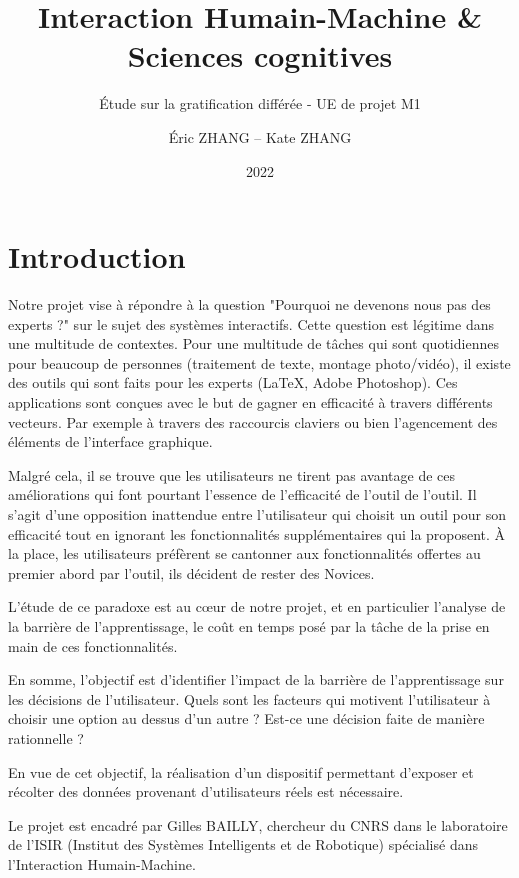 \documentclass[a4paper, 12pt]{report}
\institute{Sorbonne Université}
\title{Interaction Humain-Machine \& Sciences cognitives}
\subtitle{Étude sur la gratification différée - UE de projet M1}
\author{Éric \textsc{ZHANG} -- Kate \textsc{ZHANG}}
\date{2022}
\begin{document}
    \maketitle
    \romantableofcontents
    
    \chapter{Introduction}
    
    Notre projet vise à répondre à la question "Pourquoi ne devenons nous pas des experts ?" sur le sujet
    des systèmes interactifs.
    Cette question est légitime dans une multitude de contextes. 
    Pour une multitude de tâches qui sont quotidiennes pour beaucoup de personnes (traitement de texte, 
    montage photo/vidéo), il existe des outils qui sont faits pour les experts (LaTeX, Adobe Photoshop).
    Ces applications sont conçues avec le but de gagner en efficacité à travers différents vecteurs. Par 
    exemple à travers des raccourcis claviers \cite{remington2016practice} ou bien l’agencement des 
    éléments de l’interface graphique\cite{bailly2016visual,oulasvirta2018computational}.
    
    Malgré cela, il se trouve que les utilisateurs ne tirent pas avantage de ces améliorations qui font 
    pourtant l'essence de l'efficacité de l'outil de l’outil\cite{cockburn2014supporting}. Il s’agit d’une opposition 
    inattendue entre l’utilisateur qui choisit un outil pour son efficacité tout en ignorant les 
    fonctionnalités supplémentaires qui la proposent. À la place, les utilisateurs préfèrent se cantonner 
    aux fonctionnalités offertes au premier abord par l'outil, ils décident de rester des Novices.
    
    L’étude de ce paradoxe est au cœur de notre projet, et en particulier l’analyse de la barrière de
    l’apprentissage, le coût en temps posé par la tâche de la prise en main de ces fonctionnalités.
    
    
    En somme, l'objectif est d'identifier l'impact de la barrière de l'apprentissage sur les décisions de 
    l'utilisateur. Quels sont les facteurs qui motivent l'utilisateur à choisir une option au dessus d'un autre ? 
    Est-ce une décision faite de manière rationnelle ?
    
    En vue de cet objectif, la réalisation d'un dispositif permettant d'exposer et récolter 
    des données provenant d'utilisateurs réels est nécessaire. 
    
    
    Le projet est encadré par Gilles BAILLY, chercheur du CNRS dans le laboratoire de l'ISIR (Institut des 
    Systèmes Intelligents et de Robotique) spécialisé dans l'Interaction Humain-Machine.
    
\end{document}
